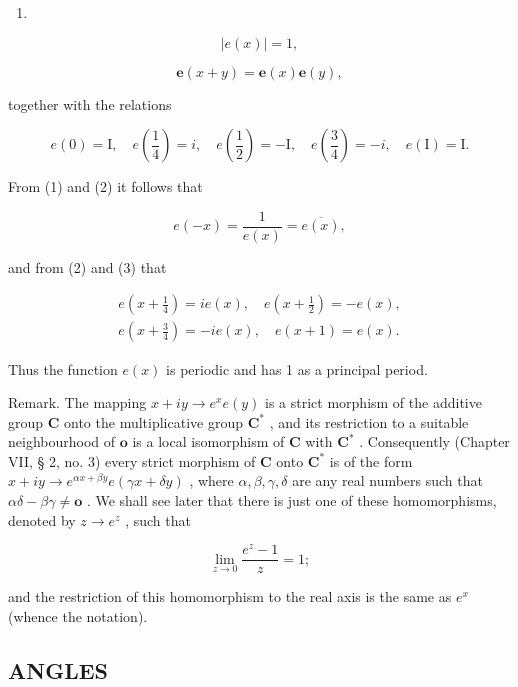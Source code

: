 \begin{enumerate}
\def\labelenumi{(\arabic{enumi})}
\tightlist
\item
\end{enumerate}

\[
\left| e (x) \right| = 1,\tag{2}
\]

\[
\boldsymbol {e} (x + y) = \boldsymbol {e} (x) \boldsymbol {e} (y),
\]

together with the relations

\[
e (0) = \mathrm{I}, \quad e (\frac {1}{4}) = i, \quad e (\frac {1}{2}) = - \mathrm{I}, \quad e (\frac {3}{4}) = - i, \quad e (\mathrm{I}) = \mathrm{I}. \tag {3}
\]

From (1) and (2) it follows that

\[
e (- x) = \frac {1}{e (x)} = \overline {{{{e (x)}}}},\tag{4}
\]

and from (2) and (3) that

\[
\begin{array}{l} e (x + \frac {1}{4}) = i e (x), \quad e (x + \frac {1}{2}) = - e (x), \\ e (x + \frac {3}{4}) = - i e (x), \quad e (x + 1) = e (x). \end{array}
\]

Thus the function \(e(x)\) is periodic and has 1 as a principal period.

Remark. The mapping \(x + iy \to e^x e(y)\) is a strict morphism of the additive group \(\mathbf{C}\) onto the multiplicative group \(\mathbf{C}^*\) , and its restriction to a suitable neighbourhood of \(\mathbf{o}\) is a local isomorphism of \(\mathbf{C}\) with \(\mathbf{C}^*\) . Consequently (Chapter VII, § 2, no. 3) every strict morphism of \(\mathbf{C}\) onto \(\mathbf{C}^*\) is of the form \(x + iy \to e^{\alpha x + \beta y} e(\gamma x + \delta y)\) , where \(\alpha, \beta, \gamma, \delta\) are any real numbers such that \(\alpha \delta - \beta \gamma \neq \mathbf{o}\) . We shall see later that there is just one of these homomorphisms, denoted by \(z \rightarrow e^{z}\) , such that

\[
\lim _ {z \rightarrow 0} \frac {e ^ {z} - 1}{z} = 1;
\]

and the restriction of this homomorphism to the real axis is the same as \(e^{x}\) (whence the notation).

\subsection{ANGLES}

